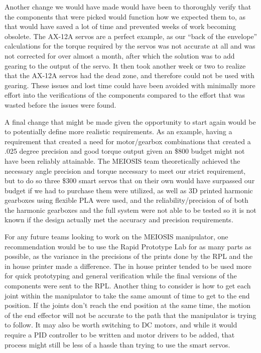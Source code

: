 Another change we would have made would have been to thoroughly verify that the components that were picked would function how we expected them to, as that would have saved a lot of time and prevented weeks of work becoming obsolete. The AX-12A servos are a perfect example, as our “back of the envelope” calculations for the torque required by the servos was not accurate at all and was not corrected for over almost a month, after which the solution was to add gearing to the output of the servo. It then took another week or two to realize that the AX-12A servos had the dead zone, and therefore could not be used with gearing. These issues and lost time could have been avoided with minimally more effort into the verifications of the components compared to the effort that was wasted before the issues were found.

A final change that might be made given the opportunity to start again would be to potentially define more realistic requirements. As an example, having a requirement that created a need for motor/gearbox combinations that created a .025 degree precision and good torque output given an \$800 budget might not have been reliably attainable. The MEIOSIS team theoretically achieved the necessary angle precision and torque necessary to meet our strict requirement, but to do so three \$300 smart servos that on their own would have surpassed our budget if we had to purchase them were utilized, as well as 3D printed harmonic gearboxes using flexible PLA were used, and the reliability/precision of of both the harmonic gearboxes and the full system were not able to be tested so it is not known if the design actually met the accuracy and precision requirements.

For any future teams looking to work on the MEIOSIS manipulator, one recommendation would be to use the Rapid Prototype Lab for as many parts as possible, as the variance in the precisions of the prints done by the RPL and the in house printer made a difference. The in house printer tended to be used more for quick prototyping and general verification while the final versions of the components were sent to the RPL. Another thing to consider is how to get each joint within the manipulator to take the same amount of time to get to the end position. If the joints don’t reach the end position at the same time, the motion of the end effector will not be accurate to the path that the manipulator is trying to follow. It may also be worth switching to DC motors, and while it would require a PID controller to be written and motor drivers to be added, that process might still be less of a hassle than trying to use the smart servos.
\newpage

